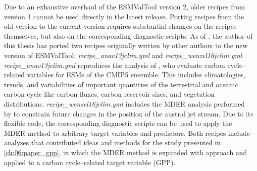 Due to an exhaustive overhaul of the \ac{ESMValTool} version 2, older recipes
from version 1 \autocite{Eyring2016a} cannot be used directly in the latest
release. Porting recipes from the old version to the current version requires
substantial changes on the recipes themselves, but also on the corresponding
diagnostic scripts. As of \TheMonth{}, the author of this thesis has ported two
recipes originally written by other authors to the new version of
\ac{ESMValTool}: \emph{recipe\_anav13jclim.yml} and
\emph{recipe\_wenzel16jclim.yml}. \emph{recipe\_anav13jclim.yml} reproduces the
analysis of \textcite{Anav2013}, who evaluate carbon cycle--related variables
for \acp{ESM} of the \acs{CMIP}5 ensemble. This includes climatologies, trends,
and variabilities of important quantities of the terrestrial and oceanic carbon
cycle like carbon fluxes, carbon reservoir sizes, and vegetation distributions.
\emph{recipe\_wenzel16jclim.yml} includes the \ac{MDER} analysis performed by
\textcite{Wenzel2016a} to constrain future changes in the position of the
austral jet stream. Due to its flexible code, the corresponding diagnostic
scripts can be used to apply the \ac{MDER} method to arbitrary target variables
and predictors. Both recipes include analyses that contributed ideas and
methods for the study presented in \cref{ch:06:paper_gpp}, in which the
\ac{MDER} method is expanded with  approach and applied to a carbon
cycle--related target variable (\ac{GPP}).


